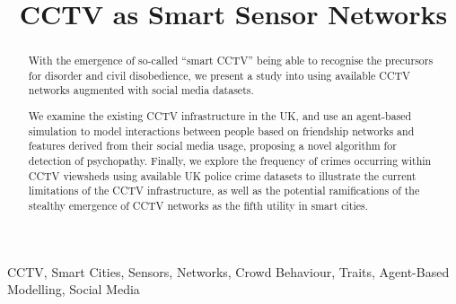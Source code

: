 \documentclass[conference]{IEEEtran}
\begin{document}
%
\title{CCTV as Smart Sensor Networks}


\author{
}





\maketitle


\begin{abstract}
With the emergence of so-called ``smart CCTV'' being able to recognise
the precursors for disorder and civil disobedience, we present a study
into using available CCTV networks augmented with social media
datasets.

We examine the existing CCTV infrastructure in the UK, and use an
agent-based simulation to model interactions between people based on
friendship networks and features derived from their social media
usage, proposing a novel algorithm for detection of
psychopathy. Finally, we explore the frequency of crimes occurring
within CCTV viewsheds using available UK police crime datasets to
illustrate the current limitations of the CCTV infrastructure, as well
as the potential ramifications of the stealthy emergence of CCTV
networks as the fifth utility in smart cities.
\end{abstract}

%

\begin{IEEEkeywords}
CCTV, Smart Cities, Sensors, Networks, Crowd Behaviour, Traits, Agent-Based
Modelling, Social Media
\end{IEEEkeywords}
\end{document}
